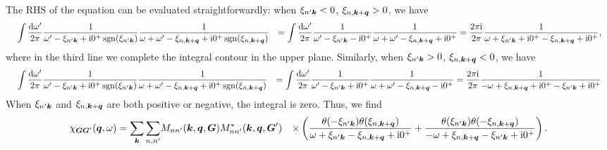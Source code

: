 \documentclass[hyperref, a4paper]{report}
\DeclareMathOperator{\sgn}{sgn}
\newcommand*{\ii}{\mathrm{i}}
\def\\{}%
\begin{document}
The RHS of the equation can be evaluated straightforwardly:
when $\xi_{n' \vb*{k}} < 0$, $\xi_{n ,\vb*{k} + \vb*{q}} > 0$, 
we have 
\[
    \begin{aligned}
        &\quad \int \frac{\dd{\omega'}}{2\pi} 
        \frac{1}{\omega' - \xi_{n' \vb*{k}} + \ii 0^+ \sgn(\xi_{n' \vb*{k}})} 
        \frac{1}{\omega + \omega' - \xi_{n, \vb*{k} + \vb*{q}} + \ii 0^+ \sgn(\xi_{n, \vb*{k} + \vb*{q}})} \\
        &= \int \frac{\dd{\omega'}}{2\pi} 
        \frac{1}{\omega' - \xi_{n' \vb*{k}} - \ii 0^+ } 
        \frac{1}{\omega + \omega' - \xi_{n, \vb*{k} + \vb*{q}} + \ii 0^+ } \\
        &= \frac{2\pi \ii}{2\pi} \frac{1}{\omega
        + \xi_{n' \vb*{k}} + \ii 0^+ - \xi_{n, \vb*{k} + \vb*{q}} + \ii 0^+ },
    \end{aligned}
\]
where in the third line we complete the integral contour in the upper plane.
Similarly, when $\xi_{n' \vb*{k}} > 0$, $\xi_{n, \vb*{k} + \vb*{q}} < 0$, 
we have 
\[
    \begin{aligned}
        &\quad \int \frac{\dd{\omega'}}{2\pi} 
        \frac{1}{\omega' - \xi_{n' \vb*{k}} + \ii 0^+ \sgn(\xi_{n' \vb*{k}})} 
        \frac{1}{\omega + \omega' - \xi_{n, \vb*{k} + \vb*{q}} + \ii 0^+ \sgn(\xi_{n, \vb*{k} + \vb*{q}})} \\
        &= \int \frac{\dd{\omega'}}{2\pi} 
        \frac{1}{\omega' - \xi_{n' \vb*{k}} + \ii 0^+ } 
        \frac{1}{\omega + \omega' - \xi_{n, \vb*{k} + \vb*{q}} - \ii 0^+ } \\
        &= \frac{2\pi \ii}{2\pi} \frac{1}{
            - \omega + \xi_{n, \vb*{k} + \vb*{q}} + \ii 0^+ 
            - \xi_{n' \vb*{k}} + \ii 0^+
        }
    \end{aligned}
\]
When $\xi_{n' \vb*{k}}$ and $\xi_{n, \vb*{k} + \vb*{q}}$ are both positive or negative, 
the integral is zero.
Thus, we find 
\begin{equation}
    \begin{aligned}
        \chi_{\vb*{G} \vb*{G}'}(\vb*{q}, \omega) = \sum_{\vb*{k}} \sum_{n, n'} 
        &M_{n n'} (\vb*{k}, \vb*{q}, \vb*{G}) M^*_{nn'} (\vb*{k}, \vb*{q}, \vb*{G}') \\
        &\times \left(
            \frac{
                \theta(- \xi_{n' \vb*{k}}) \theta(\xi_{n, \vb*{k} + \vb*{q}})
            }{
                \omega + \xi_{n' \vb*{k}} - \xi_{n, \vb*{k} + \vb*{q}} + \ii 0^+
            }
            + \frac{
                \theta(\xi_{n' \vb*{k}}) \theta(- \xi_{n, \vb*{k} + \vb*{q}})
            }{
                - \omega + \xi_{n, \vb*{k} + \vb*{q}} - \xi_{n' \vb*{k}} + \ii 0^+
            }
        \right).
    \end{aligned}
\end{equation}
\end{document}
